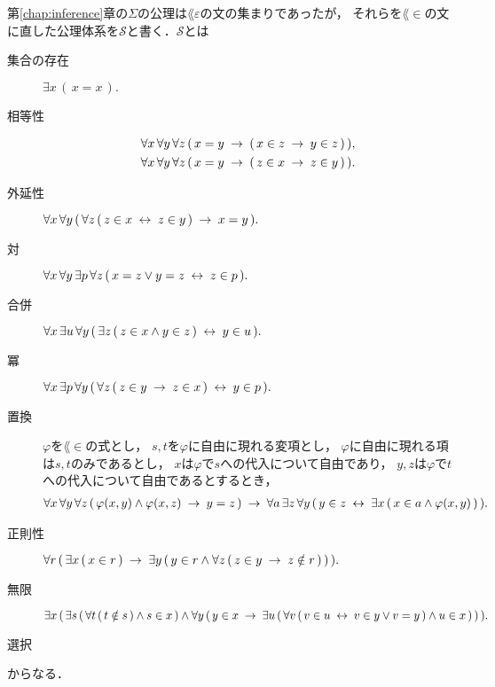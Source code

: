	第\ref{chap:inference}章の$\Sigma$の公理は$\lang{\varepsilon}$の文の集まりであったが，
	それらを$\lang{\in}$の文に直した公理体系を$\mathscr{S}$と書く．$\mathscr{S}$とは
	\begin{description}
		\item[集合の存在] $\exists x\, (\, x = x\, ).$
		\item[相等性] 
			\begin{align}
				&\forall x\, \forall y\, \forall z\, 
				(\, x = y \hspace{0.25em}\rightarrow\hspace{0.25em} (\, x \in z \hspace{0.25em}\rightarrow\hspace{0.25em} y \in z\, )\, ), \\
				&\forall x\, \forall y\, \forall z\, 
				(\, x = y \hspace{0.25em}\rightarrow\hspace{0.25em} (\, z \in x \hspace{0.25em}\rightarrow\hspace{0.25em} z \in y\, )\, ).
			\end{align}
			
		\item[外延性] $\forall x\, \forall y\, (\, \forall z\, 
			(\, z \in x \hspace{0.25em}\leftrightarrow\hspace{0.25em} z \in y\, ) \hspace{0.25em}\rightarrow\hspace{0.25em} x = y\, ).$
			
		\item[対] $\forall x\, \forall y\, \exists p\, \forall z\, 
			(\, x = z \vee y = z \hspace{0.25em}\leftrightarrow\hspace{0.25em} z \in p\, ).$
			
		\item[合併] $\forall x\, \exists u\, \forall y\, (\, \exists z\, (\, z \in x \wedge y \in z\, ) \hspace{0.25em}\leftrightarrow\hspace{0.25em} y \in u\, ).$
			
		\item[冪] $\forall x\, \exists p\, \forall y\, 
			(\, \forall z\, (\, z \in y \hspace{0.25em}\rightarrow\hspace{0.25em} z \in x\, ) \hspace{0.25em}\leftrightarrow\hspace{0.25em} y \in p\, ).$
			
		\item[置換] $\varphi$を$\lang{\in}$の式とし，
			$s,t$を$\varphi$に自由に現れる変項とし，
			$\varphi$に自由に現れる項は$s,t$のみであるとし，
			$x$は$\varphi$で$s$への代入について自由であり，
			$y,z$は$\varphi$で$t$への代入について自由であるとするとき，
			\begin{align}
				\forall x\, \forall y\, \forall z\, 
				(\, \varphi(x,y) \wedge \varphi(x,z)
				\hspace{0.25em}\rightarrow\hspace{0.25em} y = z\, )
				\hspace{0.25em}\rightarrow\hspace{0.25em} \forall a\, \exists z\, \forall y\,
				(\, y \in z \hspace{0.25em}\leftrightarrow\hspace{0.25em} \exists x\, (\, x \in a \wedge 
				\varphi(x,y)\, )\, ).
			\end{align}
			
		\item[正則性] $\forall r\, (\, \exists x\, (\, x \in r\, ) \hspace{0.25em}\rightarrow\hspace{0.25em}
				\exists y\, (\, y \in r \wedge \forall z\, (\, z \in y \hspace{0.25em}\rightarrow\hspace{0.25em}
				z \notin r\, )\, )\, ).$
			
		\item[無限] $\exists x\, (\, 
				\exists s\, (\, \forall t\, (\, t \notin s\, ) \wedge s \in x\, ) 
				\wedge \forall y\, (\, 
				y \in x \hspace{0.25em}\rightarrow\hspace{0.25em} \exists u\, (\, 
				\forall v\, (\, v \in u \hspace{0.25em}\leftrightarrow\hspace{0.25em} v \in y \vee v = y\, )
				\wedge u \in x\, )\, )\, ).$
			
		\item[選択]
			
	\end{description}
	からなる．
	
